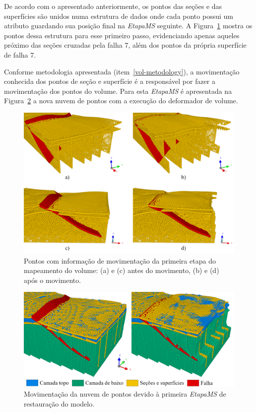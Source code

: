 De acordo com o apresentado anteriormente, os pontos das seções e das superfícies são unidos numa estrutura de dados onde cada ponto possui um atributo guardando sua posição final na \emph{EtapaMS} seguinte. A Figura~\ref{fig-vol-ex-2} mostra os pontos dessa estrutura para esse primeiro passo, evidenciando apenas aqueles próximo das seções cruzadas pela falha 7, além dos pontos da própria superfície de falha 7.

Conforme metodologia apresentada (item~\ref{vol-metodology}), a movimentação conhecida dos pontos de seção e superfície é a responsável por fazer a movimentação dos pontos do volume. Para esta \emph{EtapaMS} é apresentada na Figura~\ref{fig-vol-ex-3} a nova nuvem de pontos com a execução do deformador de volume.

\begin{figure} [H]
  \begin{center}
    \includegraphics[width=\textwidth]{images/fig-vol-ex-2}
    \caption{Pontos com informação de movimentação da primeira etapa do mapeamento do volume: (a) e (c) antes do movimento, (b) e (d) após o movimento.}\label{fig-vol-ex-2}
  \end{center}
\end{figure}

\begin{figure} [H]
  \begin{center}
    \includegraphics[width=\textwidth]{images/fig-vol-ex-3}
    \caption{Movimentação da nuvem de pontos devido à primeira \emph{EtapaMS} de restauração do modelo.}\label{fig-vol-ex-3}
  \end{center}
\end{figure}

